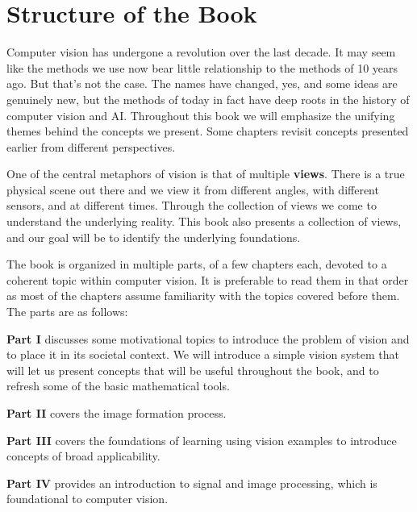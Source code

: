 
\section*{Structure of the Book}

Computer vision has undergone a revolution over the last decade. It may seem like the methods we use now bear little relationship to the methods of 10 years ago. But that's not the case. The names have changed, yes, and some ideas are genuinely new, but the methods of today in fact have deep roots in the history of computer vision and AI. Throughout this book we will emphasize the unifying themes behind the concepts we present. Some chapters revisit concepts presented earlier from different perspectives.

One of the central metaphors of vision is that of multiple {\bf views}. There is a true physical scene out there and we view it from different angles, with different sensors, and at different times. Through the collection of views we come to understand the underlying reality. This book also presents a collection of views, and our goal will be to identify the underlying foundations.

The book is organized in multiple parts, of a few chapters each, devoted to a coherent topic within computer vision. It is preferable to read them in that order as most of the chapters assume familiarity with the topics covered before them. The parts are as follows:

{\bf Part I} discusses some motivational topics to introduce the problem of vision and to place it in its societal context. We will introduce a simple vision system that will let us present concepts that will be useful throughout the book, and to refresh some of the basic mathematical tools.

    {\bf Part II} covers the image formation  process.

    {\bf Part III} covers the foundations of learning using vision examples to introduce concepts of broad applicability.

    {\bf Part IV} provides an introduction to signal and image processing, which is foundational to computer vision.

